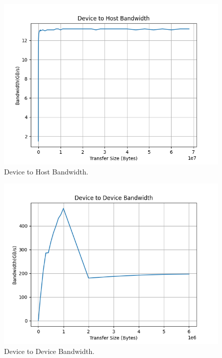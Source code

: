 \documentclass[a4paper, 12pt]{article}
\begin{document}
\begin{figure}
	\centering
	\includegraphics[width=0.8\linewidth]{device-to-host.png}
	\caption{Device to Host Bandwidth.}
	\label{fig:dth}
\end{figure}
\begin{figure}
	\centering
	\includegraphics[width=0.8\linewidth]{device-to-device.png}
	\caption{Device to Device Bandwidth.}
	\label{fig:dtd}
\end{figure}
\end{document}
